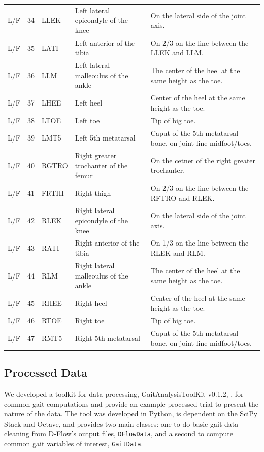 \documentclass[fleqn,12pt]{wlpeerj}
\begin{document}
\begin{table}
\begin{tabular}{lrlll}
    L/F & 34 & LLEK  & Left lateral epicondyle of the knee   & On the lateral side of the joint axis. \\
    L/F & 35 & LATI  & Left anterior of the tibia            & On 2/3 on the line between the LLEK and LLM. \\
    L/F & 36 & LLM   & Left lateral malleoulus of the ankle  & The center of the heel at the same height as the toe. \\
    L/F & 37 & LHEE  & Left heel                             & Center of the heel at the same height as the toe. \\
    L/F & 38 & LTOE  & Left toe                              & Tip of big toe. \\
    L/F & 39 & LMT5  & Left 5th metatarsal                   & Caput of the 5th metatarsal bone, on joint line midfoot/toes. \\
    L/F & 40 & RGTRO & Right greater trochanter of the femur & On the cetner of the right greater trochanter. \\
    L/F & 41 & FRTHI & Right thigh                           & On 2/3 on the line between the RFTRO and RLEK. \\
    L/F & 42 & RLEK  & Right lateral epicondyle of the knee  & On the lateral side of the joint axis. \\
    L/F & 43 & RATI  & Right anterior of the tibia           & On 1/3 on the line between the RLEK and RLM. \\
    L/F & 44 & RLM   & Right lateral malleoulus of the ankle & The center of the heel at the same height as the toe. \\
    L/F & 45 & RHEE  & Right heel                            & Center of the heel at the same height as the toe. \\
    L/F & 46 & RTOE  & Right toe                             & Tip of big toe. \\
    L/F & 47 & RMT5  & Right 5th metatarsal                  & Caput of the 5th metatarsal bone, on joint line midfoot/toes. \\
    \bottomrule
  \end{tabular}
  \label{tab:marker-labels}
\end{table}

\subsection*{Processed Data}
%
We developed a toolkit for data processing, GaitAnalysisToolKit v0.1.2,
\cite{Moore2014a}, for common gait computations and provide an example
processed trial to present the nature of the data. The tool was developed in
Python, is dependent on the SciPy Stack and Octave, and provides two main
classes: one to do basic gait data cleaning from D-Flow's output files,
\verb|DFlowData|, and a second to compute common gait variables of interest,
\verb|GaitData|.
\end{document}
